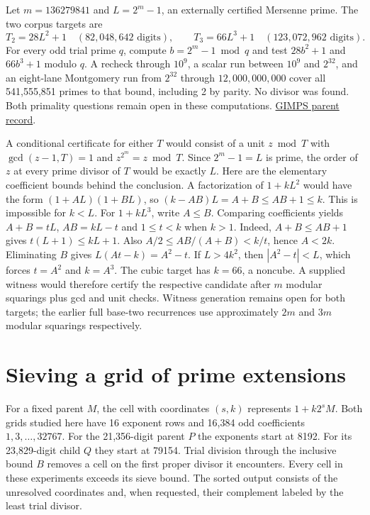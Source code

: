\documentclass[11pt,a4paper,oneside,openany]{report}
\begin{document}
Let $m=136279841$ and $L=2^m-1$, an externally certified Mersenne prime. The two corpus targets are
\[
 T_2=28L^2+1 \quad(82,048,642\text{ digits}),\qquad
 T_3=66L^3+1 \quad(123,072,962\text{ digits}).
\]
For every odd trial prime $q$, compute $b=2^m-1\bmod q$ and test $28b^2+1$ and $66b^3+1$ modulo $q$. A recheck through $10^9$, a scalar run between $10^9$ and $2^{32}$, and an eight-lane Montgomery run from $2^{32}$ through $12,000,000,000$ cover all 541,555,851 primes to that bound, including 2 by parity. No divisor was found. Both primality questions remain open in these computations. \href{https://www.mersenne.org/primes/press/M136279841.html}{GIMPS parent record}.

A conditional certificate for either $T$ would consist of a unit $z\bmod T$ with $\gcd(z-1,T)=1$ and $z^{2^m}=z\bmod T$. Since $2^m-1=L$ is prime, the order of $z$ at every prime divisor of $T$ would be exactly $L$. Here are the elementary coefficient bounds behind the conclusion. A factorization of $1+kL^2$ would have the form $(1+AL)(1+BL)$, so $(k-AB)L=A+B\le AB+1\le k$. This is impossible for $k<L$. For $1+kL^3$, write $A\le B$. Comparing coefficients yields $A+B=tL$, $AB=kL-t$ and $1\le t<k$ when $k>1$. Indeed, $A+B\le AB+1$ gives $t(L+1)\le kL+1$. Also $A/2\le AB/(A+B)<k/t$, hence $A<2k$. Eliminating $B$ gives $L(At-k)=A^2-t$. If $L>4k^2$, then $|A^2-t|<L$, which forces $t=A^2$ and $k=A^3$. The cubic target has $k=66$, a noncube. A supplied witness would therefore certify the respective candidate after $m$ modular squarings plus gcd and unit checks. Witness generation remains open for both targets; the earlier full base-two recurrences use approximately $2m$ and $3m$ modular squarings respectively.

\chapter{Sieving a grid of prime extensions}
\label{ch:grid-sieve}
For a fixed parent $M$, the cell with coordinates $(s,k)$ represents $1+k2^s M$. Both grids studied here have 16 exponent rows and 16,384 odd coefficients $1,3,\ldots,32767$. For the 21,356-digit parent $P$ the exponents start at 8192. For its 23,829-digit child $Q$ they start at 79154. Trial division through the inclusive bound $B$ removes a cell on the first proper divisor it encounters. Every cell in these experiments exceeds its sieve bound. The sorted output consists of the unresolved coordinates and, when requested, their complement labeled by the least trial divisor.
\end{document}
